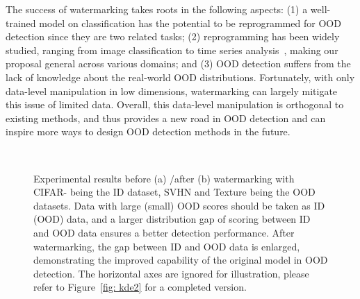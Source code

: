\documentclass{article}
\begin{document}
The success of watermarking takes roots in the following aspects: (1) a well-trained model on classification has the potential to be reprogrammed for OOD detection since they are two related tasks; (2) reprogramming has been widely studied, ranging from image classification to time series analysis~\cite{deng2009imagenet,TsaiCH20}, making our proposal general across various domains; and (3) OOD detection suffers from the lack of knowledge about the real-world OOD distributions. Fortunately, with only data-level manipulation in low dimensions, watermarking can largely mitigate this issue of limited data. Overall, this data-level manipulation is orthogonal to existing methods, and thus provides a new road in OOD detection and can inspire more ways to design OOD detection methods in the future.

\begin{figure*}[t]
    \centering
    ~~~~~
    \caption{
    Experimental results before (a) /after (b) watermarking with CIFAR- being the ID dataset, SVHN and Texture being the OOD datasets. Data with large (small) OOD scores should be taken as ID (OOD) data, and a larger distribution gap of scoring between ID and OOD data ensures a better detection performance. After watermarking, the gap between ID and OOD data is enlarged, demonstrating the improved capability of the original model in OOD detection. The horizontal axes are ignored for illustration, please refer to Figure~\ref{fig: kde2} for a completed version.
    }
    \label{fig:kde}
\end{figure*}
\end{document}
